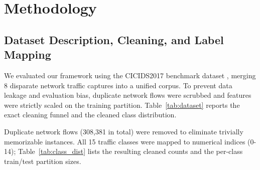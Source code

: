 \documentclass[conference]{IEEEtran}
\begin{document}
\section{Methodology}

\subsection{Dataset Description, Cleaning, and Label Mapping}
We evaluated our framework using the CICIDS2017 benchmark dataset 
\cite{c1,c14}, merging 8 disparate network traffic captures into a 
unified corpus. To prevent data leakage and evaluation bias, duplicate network flows were scrubbed and features were strictly scaled on the training partition. Table~\ref{tab:dataset} reports the exact cleaning funnel and the cleaned class distribution.

\begin{table}[htbp]
\centering
\caption{CICIDS2017 Cleaning Funnel and Cleaned Class Distribution}
\label{tab:dataset}
\end{table}

Duplicate network flows (308{,}381 in total) were removed to eliminate trivially memorizable instances. All 15 traffic classes were mapped to numerical indices (0-14); Table~\ref{tab:class_dist} lists the resulting cleaned counts and the per-class train/test partition sizes.
\end{document}
